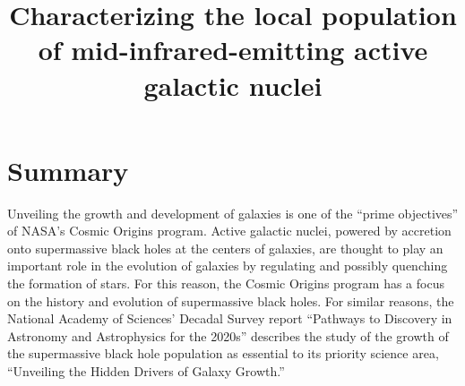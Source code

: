 \documentclass[12pt, preprint]{hacked-aastex}
\begin{document}
\pagestyle{plain}

\newcommand{\imtxt}[1]{\textcolor{red}{#1}}
\newcommand{\imsout}[1]{\textcolor{red}{\sout{#1}}}

\title{{\large Characterizing the local population of mid-infrared-emitting active galactic nuclei}}

\maketitle

\renewcommand{\baselinestretch}{0.75}\normalsize
{\hypersetup{hidelinks} \tableofcontents }
\renewcommand{\baselinestretch}{1.0}\normalsize


\newpage
\section{Summary}\label{sec:summary}

Unveiling the growth and development of galaxies is one of the ``prime
objectives'' of NASA's Cosmic Origins program.  Active galactic
nuclei, powered by accretion onto supermassive black holes at the
centers of galaxies, are thought to play an important role in the
evolution of galaxies by regulating and possibly quenching the
formation of stars.  For this reason, the Cosmic Origins program has a
focus on the history and evolution of supermassive black holes.  For
similar reasons, the National Academy of Sciences' Decadal Survey
report ``Pathways to Discovery in Astronomy and Astrophysics for the
2020s'' describes the study of the growth of the supermassive black hole
population as essential to its priority science area, ``Unveiling the
Hidden Drivers of Galaxy Growth.''
\end{document}
